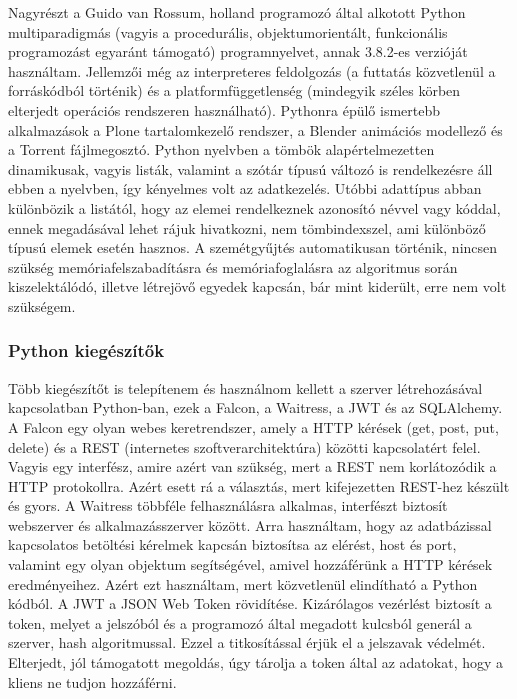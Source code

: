 \documentclass[a4paper,12pt]{article}
\begin{document}
Nagyrészt a Guido van Rossum, holland programozó által alkotott Python multiparadigmás 
(vagyis a procedurális, objektumorientált, funkcionális programozást egyaránt támogató)
programnyelvet, annak 3.8.2-es verzióját használtam. Jellemzői még az interpreteres 
feldolgozás (a futtatás közvetlenül a forráskódból történik) és a platformfüggetlenség 
(mindegyik széles körben elterjedt operációs rendszeren használható). Pythonra épülő
ismertebb alkalmazások a Plone tartalomkezelő rendszer, a Blender animációs modellező
és a Torrent fájlmegosztó. Python nyelvben a tömbök alapértelmezetten dinamikusak, vagyis
listák, valamint a szótár típusú változó is rendelkezésre áll ebben a nyelvben, így 
kényelmes volt az adatkezelés. Utóbbi adattípus abban különbözik a listától, hogy az 
elemei rendelkeznek azonosító névvel vagy kóddal, ennek megadásával lehet rájuk hivatkozni, 
nem tömbindexszel, ami különböző típusú elemek esetén hasznos. A szemétgyűjtés 
automatikusan történik, nincsen szükség memóriafelszabadításra és memóriafoglalásra az 
algoritmus során kiszelektálódó, illetve létrejövő egyedek kapcsán, bár mint kiderült,
erre nem volt szükségem.

\subsubsection{Python kiegészítők}

Több kiegészítőt is telepítenem és használnom kellett a szerver létrehozásával kapcsolatban Python-ban, ezek a Falcon, a Waitress, a JWT és az SQLAlchemy. A Falcon egy olyan webes keretrendszer, amely a HTTP kérések (get, post, put, delete) és a REST (internetes szoftverarchitektúra) közötti  kapcsolatért felel. Vagyis egy interfész, amire azért van szükség, mert a REST nem korlátozódik a HTTP protokollra. Azért esett rá a választás, mert kifejezetten REST-hez készült és gyors. A Waitress többféle felhasználásra alkalmas, interfészt biztosít webszerver és alkalmazásszerver között. Arra használtam, hogy az adatbázissal kapcsolatos betöltési kérelmek kapcsán biztosítsa az elérést, host és port, valamint egy olyan objektum segítségével, amivel hozzáférünk a HTTP kérések eredményeihez. Azért ezt használtam, mert közvetlenül elindítható a Python kódból. A JWT a JSON Web Token rövidítése. Kizárólagos vezérlést biztosít a token, melyet a jelszóból és a programozó által megadott kulcsból generál a szerver, hash algoritmussal. Ezzel a titkosítással érjük el a jelszavak védelmét. Elterjedt, jól támogatott megoldás, úgy tárolja a token által az adatokat, hogy a kliens ne tudjon hozzáférni.
\end{document}
